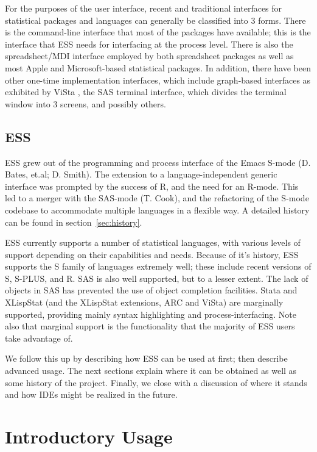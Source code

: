 \documentclass{article}
\begin{document}
For the purposes of the user interface, recent and traditional
interfaces for statistical packages and languages can generally be
classified into 3 forms.  There is the command-line interface that
most of the packages have available; this is the interface that ESS
needs for interfacing at the process level.  There is also the
spreadsheet/MDI interface employed by both spreadsheet packages as
well as most Apple and Microsoft-based statistical packages.  In
addition, there have been other one-time implementation interfaces,
which include graph-based interfaces as exhibited by ViSta
\citep{youn:lubi:1995}, the SAS terminal interface, which divides the
terminal window into 3 screens, and possibly others.


\subsection{ESS}
\label{sec:intro:ESS}


ESS grew out of the programming and process interface of the Emacs
S-mode (D. Bates, et.al; D. Smith).  The extension to a
language-independent generic interface was prompted by the success of
R, and the need for an R-mode.  This led to a merger with the SAS-mode
(T. Cook), and the refactoring of the S-mode codebase to accommodate
multiple languages in a flexible way.  A detailed  history can be
found in section~\ref{sec:history}.

ESS currently supports a number of statistical languages, with various
levels of support depending on their capabilities and needs.  Because
of it's history, ESS supports the S family of languages extremely
well; these include recent versions of S, S-PLUS, and R.  SAS is also
well supported, but to a lesser extent.  The lack of objects in SAS
has prevented the use of object completion facilities.  Stata and
XLispStat (and the XLispStat extensions, ARC and ViSta) are marginally
supported, providing mainly syntax highlighting and
process-interfacing.  Note also that marginal support is the
functionality that the majority of ESS users take advantage of.

We follow this up by describing how ESS can be used at first; then
describe advanced usage.  The next sections explain where it can be
obtained as well as some history of the project.  Finally, we close
with a discussion of where it stands and how IDEs might be realized in
the future.

\section{Introductory Usage}
\label{sec:basic}
\end{document}
